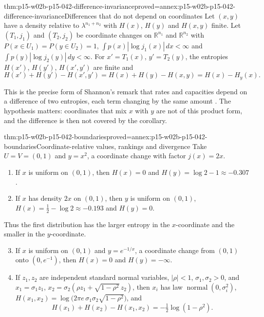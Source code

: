 \begin{hbcorollary}{thm:p15-w02b-p15-042-difference-invariance}{proved=annex:p15-w02b-p15-042-difference-invariance}{Differences that do not depend on coordinates}
Let \((x,y)\) have a density relative to \(\lambda^{n_1+n_2}\) with
\(H(x)\), \(H(y)\) and \(H(x,y)\) finite. Let \((T_1,j_1)\) and
\((T_2,j_2)\) be coordinate changes on \(\mathbb R^{n_1}\) and
\(\mathbb R^{n_2}\) with \(P(x\in U_1)=P(y\in U_2)=1\),
\(\int p(x)|\log j_1(x)|\,dx<\infty\) and
\(\int p(y)|\log j_2(y)|\,dy<\infty\). For \(x'=T_1(x)\), \(y'=T_2(y)\), the
entropies \(H(x')\), \(H(y')\), \(H(x',y')\) are finite and
\[
 H(x')+H(y')-H(x',y')=H(x)+H(y)-H(x,y)=H(x)-H_y(x).
\]
\end{hbcorollary}

This is the precise form of Shannon's remark that rates and capacities depend
on a difference of two entropies, each term changing by the same amount
\cite[sec.~20, p.~38]{Shannon1948MathematicalTheory}. The hypothesis matters:
coordinates that mix \(x\) with \(y\) are not of this product form, and the
difference is then not covered by the corollary.

\begin{hbtheorem}{thm:p15-w02b-p15-042-boundaries}{proved=annex:p15-w02b-p15-042-boundaries}{Coordinate-relative values, rankings and divergence}
Take \(U=V=(0,1)\) and \(y=x^2\), a coordinate change with factor
\(j(x)=2x\).
\begin{enumerate}
\item If \(x\) is uniform on \((0,1)\), then \(H(x)=0\) and
      \(H(y)=\log2-1\approx-0.307\).
\item If \(x\) has density \(2x\) on \((0,1)\), then \(y\) is uniform on
      \((0,1)\), \(H(x)=\tfrac12-\log2\approx-0.193\) and \(H(y)=0\).
\end{enumerate}
Thus the first distribution has the larger entropy in the \(x\)-coordinate
and the smaller in the \(y\)-coordinate.
\begin{enumerate}\setcounter{enumi}{2}
\item If \(x\) is uniform on \((0,1)\) and \(y=e^{-1/x}\), a coordinate change
      from \((0,1)\) onto \((0,e^{-1})\), then \(H(x)=0\) and
      \(H(y)=-\infty\).
\item If \(z_1,z_2\) are independent standard normal variables, \(|\rho|<1\),
      \(\sigma_1,\sigma_2>0\), and
      \(x_1=\sigma_1z_1\), \(x_2=\sigma_2(\rho z_1+\sqrt{1-\rho^2}\,z_2)\),
      then \(x_i\) has law \(\operatorname{normal}(0,\sigma_i^2)\),
      \(H(x_1,x_2)=\log\bigl(2\pi e\,\sigma_1\sigma_2\sqrt{1-\rho^2}\bigr)\),
      and
      \[
       H(x_1)+H(x_2)-H(x_1,x_2)=-\tfrac12\log(1-\rho^2).
      \]
\end{enumerate}
\end{hbtheorem}


